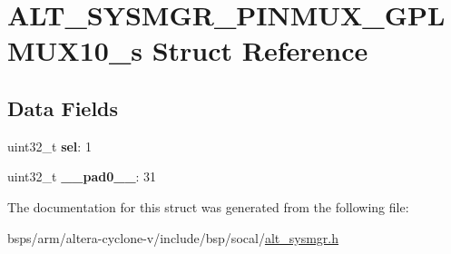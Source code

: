 \hypertarget{structALT__SYSMGR__PINMUX__GPLMUX10__s}{}\section{A\+L\+T\+\_\+\+S\+Y\+S\+M\+G\+R\+\_\+\+P\+I\+N\+M\+U\+X\+\_\+\+G\+P\+L\+M\+U\+X10\+\_\+s Struct Reference}
\label{structALT__SYSMGR__PINMUX__GPLMUX10__s}
\subsection*{Data Fields}
\begin{DoxyCompactItemize}
\item 
\mbox{\label{structALT__SYSMGR__PINMUX__GPLMUX10__s_a54a97b3862ac16b4d88ebaf6e64d34c3}} 
uint32\+\_\+t {\bfseries sel}\+: 1
\item 
\mbox{\label{structALT__SYSMGR__PINMUX__GPLMUX10__s_a93fc3b7135949f4bb7048ee925c47be3}} 
uint32\+\_\+t {\bfseries \+\_\+\+\_\+pad0\+\_\+\+\_\+}\+: 31
\end{DoxyCompactItemize}


The documentation for this struct was generated from the following file\+:\begin{DoxyCompactItemize}
\item 
bsps/arm/altera-\/cyclone-\/v/include/bsp/socal/\mbox{\hyperlink{alt__sysmgr_8h}{alt\+\_\+sysmgr.\+h}}\end{DoxyCompactItemize}
